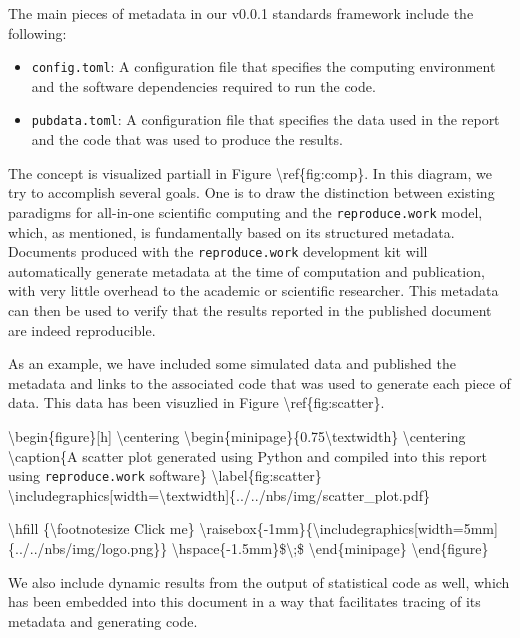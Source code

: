 The main pieces of metadata in our v0.0.1 standards framework include the following:

\begin{itemize}
\itemsep -0.2em
\item \texttt{config.toml}: A configuration file that specifies the computing environment and the software dependencies required to run the code.
\item \texttt{pubdata.toml}: A configuration file that specifies the data used in the report and the code that was used to produce the results.
\end{itemize}

The concept is visualized partiall in Figure \textbackslash{}ref\{fig:comp\}. In this diagram, we try to accomplish several goals. One is to draw the distinction between existing paradigms for all-in-one scientific computing and the \texttt{reproduce.work} model, which, as mentioned, is fundamentally based on its structured metadata. Documents produced with the \texttt{reproduce.work} development kit will automatically generate metadata at the time of computation and publication, with very little overhead to the academic or scientific researcher. This metadata can then be used to verify that the results reported in the published document are indeed reproducible.

As an example, we have included some simulated data and published the metadata and links to the associated code that was used to generate each piece of data. This data has been visuzlied in Figure \textbackslash{}ref\{fig:scatter\}.

\textbackslash{}begin\{figure\}[h]
\textbackslash{}centering
\textbackslash{}begin\{minipage\}\{0.75\textbackslash{}textwidth\}
\textbackslash{}centering
\textbackslash{}caption\{A scatter plot generated using Python and compiled into this report using \texttt{reproduce.work} software\}
\textbackslash{}label\{fig:scatter\}
\textbackslash{}includegraphics[width=\textbackslash{}textwidth]\{../../nbs/img/scatter\_plot.pdf\}

\textbackslash{}hfill \{\textbackslash{}footnotesize Click me\} \textbackslash{}raisebox\{-1mm\}\{\textbackslash{}includegraphics[width=5mm]\{../../nbs/img/logo.png\}\} \textbackslash{}hspace\{-1.5mm\}\$\textbackslash{};\$
\textbackslash{}end\{minipage\}
\textbackslash{}end\{figure\}


We also include dynamic results from the output of statistical code as well, which has been embedded into this document in a way that facilitates tracing of its metadata and generating code. 

